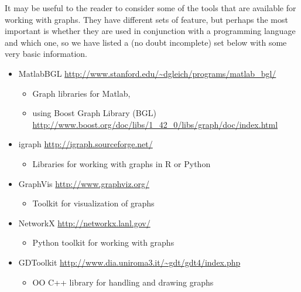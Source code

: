 




It may be useful to the reader to consider some of the tools that are
available for working with graphs. They have different sets of
feature, but perhaps the most important is whether they are used in
conjunction with a programming language and which one, so we have
listed a (no doubt incomplete) set below with some very basic
information.
  \begin{itemize}
\setlength{\itemsep}{-1mm}
\setlength{\topsep}{-1mm}

  \item MatlabBGL \url{http://www.stanford.edu/~dgleich/programs/matlab_bgl/}
    \begin{itemize}
    \item Graph libraries for Matlab, 
    \item using Boost Graph Library (BGL) \\
 {\url{http://www.boost.org/doc/libs/1_42_0/libs/graph/doc/index.html}}
    \end{itemize}

  \item igraph \url{http://igraph.sourceforge.net/}
    \begin{itemize}
    \item Libraries for working with graphs in R or Python
    \end{itemize}

  \item GraphVis \url{http://www.graphviz.org/}
    \begin{itemize}
    \item Toolkit for visualization of graphs
    \end{itemize}

  \item NetworkX \url{http://networkx.lanl.gov/}
    \begin{itemize}
    \item Python toolkit for working with graphs
    \end{itemize}

  \item GDToolkit
     \url{http://www.dia.uniroma3.it/~gdt/gdt4/index.php}
     \begin{itemize}
     \item OO C++ library for handling and drawing graphs
     \end{itemize}


\end{itemize}
